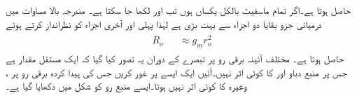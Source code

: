 حاصل ہوتا ہے۔اگر  تمام ماسفیٹ بالکل یکساں ہوں تب  اور  لکھا جا سکتا ہے۔ مندرجہ بالا مساوات میں درمیانی جزو بقایا دو اجزاء سے بہت بڑی ہے لہٰذا  پہلی اور آخری اجزاء کو نظرانداز کرتے ہوئے
\begin{gather}
\begin{aligned}
R_o & & \approx g_m r_o^2
\end{aligned} 
\end{gather}
حاصل ہوتا ہے۔
مختلف آئینہ برقی رو پر تبصرے کے دوران یہ تصور کیا گیا کہ  ایک مستقل مقدار ہے جس پر منبع دباو  اور  کا کوئی اثر نہیں۔آئیں ایک ایسے  پر غور کریں جس کی پیدا کردہ برقی رو پر  ،  وغیرہ کا کوئی اثر نہیں ہوتا۔ایسے  منبع رو کو شکل  میں دکھایا گیا ہے۔

